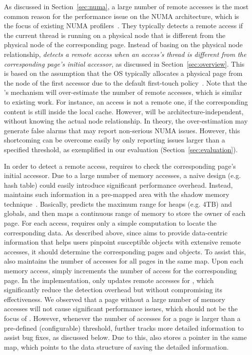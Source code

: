 As discussed in Section~\ref{sec:numa},  a large number of remote accesses is the most common reason for the performance issue on the NUMA architecture, which is the focus of existing NUMA profilers~\cite{XuNuma, valat:2018:numaprof}. They typically detects a remote access if the current thread is running on a physical node that is different from the physical node of the corresponding page. Instead of basing on the physical node relationship, \textit{\NP{} detects a remote access when an access's thread is different from the corresponding page's initial accessor}, as discussed in Section~\ref{sec:overview}. This is based on the assumption that the OS typically allocates a physical page from the node of the first accessor due to the default first-touch policy~\cite{firsttouch}.  Note that the \NP{}'s mechanism will over-estimate the number of remote accesses, which is similar to existing work. For instance, an access is not a remote one, if the corresponding content is still inside the local cache. However, \NP{} will be architecture-independent, without knowing the actual node relationship.  In theory, the over-estimation may generate false alarms that may report non-serious NUMA issues.  However, this shortcoming can be overcome easily by only reporting issues larger than a specified threshold, as exemplified in our evaluation (Section~\ref{sec:evaluation}).  

In order to detect a remote access, \NP{} requires to check the corresponding page's initial accessor. Due to a large number of memory accesses, a naive design (e.g. hash table) could easily introduce significant performance overhead. Instead, \NP{} maintains such information in a pre-mapped area with the shadow memory technique~\cite{qinzhao}. Basically, \NP{} predicts the maximum range for heaps (e.g. 4TB) and globals, and then maps a continuous range of memory to store the owner of each page. For each access, \NP{} requires only a simple computation to locate the corresponding data. As described above, since \NP{} aims to provide data-centric information that helps users pinpoint susceptible objects with extensive remote accesses, it should determine the corresponding pages and objects. To assist this, \NP{} also maintains the number of accesses for all pages in the same map. Upon each memory access, \NP{} simply increments the number of access for the corresponding page. In the implementation, \NP{} only updates remote accesses for , which significantly reduce the detection overhead but without compromising its effectiveness. We observed that a page without a large number of memory accesses will not cause significant performance issues, which should not be the focus of \NP{}. However, whenever the number of accesses for a page is larger than a pre-defined (configurable) threshold, \NP{} further tracks more detailed information to assist bug fixes, as discussed below. Due to this, \NP{} also stores a pointer in the same map, which points to the data structure of saving the detailed information.   

